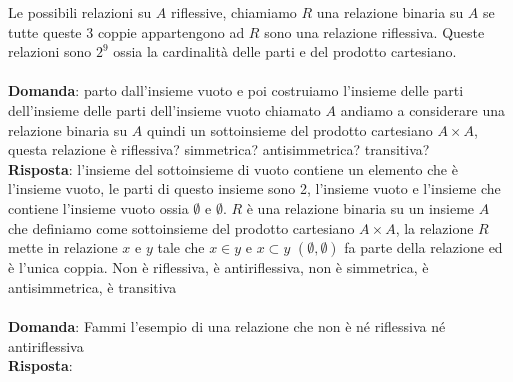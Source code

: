 \documentclass{article}
\begin{document}
Le possibili relazioni su $A$ riflessive, chiamiamo $R$ una relazione binaria su $A$ se tutte queste 3 coppie appartengono ad $R$ sono una relazione riflessiva.
Queste relazioni sono  $2^9$ ossia la cardinalità delle parti e del prodotto cartesiano.\\ \\
\textbf{Domanda}: parto dall'insieme vuoto e poi costruiamo l'insieme delle parti dell'insieme delle parti dell'insieme vuoto chiamato $A$ andiamo a considerare una relazione binaria su $A$ quindi 
un sottoinsieme del prodotto cartesiano $A \times A$, questa relazione è riflessiva? simmetrica? antisimmetrica? transitiva?\\
\textbf{Risposta}: l'insieme del sottoinsieme di vuoto contiene un elemento che è l'insieme vuoto, le parti di questo insieme sono 2, l'insieme vuoto e l'insieme che contiene l'insieme vuoto ossia $\emptyset $ e ${\emptyset}$.
$R$ è una relazione binaria su un insieme $A$ che definiamo come sottoinsieme del prodotto cartesiano $A \times A$, la relazione $R$ mette in relazione $x$ e $y$ tale che $x \in y$ e $x \subset y$ 
$(\emptyset, {\emptyset})$ fa parte della relazione ed è l'unica coppia. Non è riflessiva, è antiriflessiva, non è simmetrica, è antisimmetrica, è transitiva\\ \\
\textbf{Domanda}: Fammi l'esempio di una relazione che non è né riflessiva né antiriflessiva \\
\textbf{Risposta}:\\ \\
\end{document}
